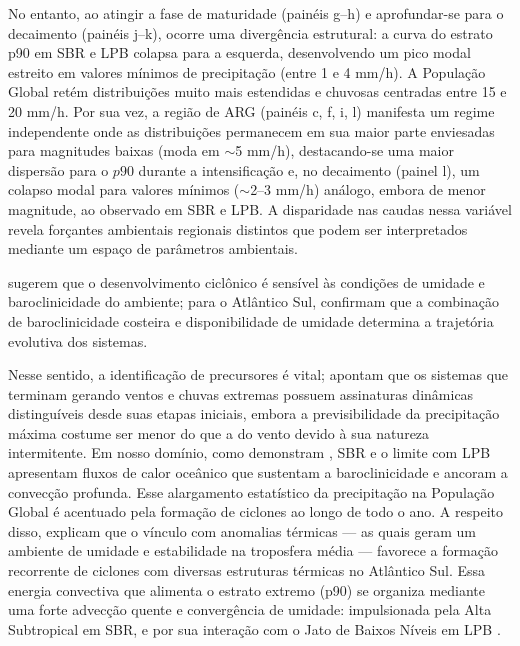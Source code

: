 No entanto, ao atingir a fase de maturidade (painéis g--h) e aprofundar-se para o decaimento (painéis j--k), ocorre uma divergência estrutural: a curva do estrato p90 em SBR e LPB colapsa para a esquerda, desenvolvendo um pico modal estreito em valores mínimos de precipitação (entre 1 e 4 mm/h).
A População Global retém distribuições muito mais estendidas e chuvosas centradas entre 15 e 20 mm/h.
Por sua vez, a região de ARG (painéis c, f, i, l) manifesta um regime independente onde as distribuições permanecem em sua maior parte enviesadas para magnitudes baixas (moda em $\sim$5 mm/h), destacando-se uma maior dispersão para o $p90$ durante a intensificação e, no decaimento (painel l), um colapso modal para valores mínimos ($\sim$2--3 mm/h) análogo, embora de menor magnitude, ao observado em SBR e LPB.
A disparidade nas caudas nessa variável revela forçantes ambientais regionais distintos que podem ser interpretados mediante um espaço de parâmetros ambientais.

\citet{yanase2014parameter} sugerem que o desenvolvimento ciclônico é sensível às condições de umidade e baroclinicidade do ambiente; para o Atlântico Sul, \citet{gramcianinov2019properties} confirmam que a combinação de baroclinicidade costeira e disponibilidade de umidade determina a trajetória evolutiva dos sistemas.

Nesse sentido, a identificação de precursores é vital; \citet{laurila2021characteristics} apontam que os sistemas que terminam gerando ventos e chuvas extremas possuem assinaturas dinâmicas distinguíveis desde suas etapas iniciais, embora a previsibilidade da precipitação máxima costume ser menor do que a do vento devido à sua natureza intermitente.
Em nosso domínio, como demonstram \citet{russo2025impacts}, SBR e o limite com LPB apresentam fluxos de calor oceânico que sustentam a baroclinicidade e ancoram a convecção profunda.
Esse alargamento estatístico da precipitação na População Global é acentuado pela formação de ciclones ao longo de todo o ano. A respeito disso, \citet{evans2012climatology} explicam que o vínculo com anomalias térmicas --- as quais geram um ambiente de umidade e estabilidade na troposfera média --- favorece a formação recorrente de ciclones com diversas estruturas térmicas no Atlântico Sul.
Essa energia convectiva que alimenta o estrato extremo (p90) se organiza mediante uma forte advecção quente e convergência de umidade: impulsionada pela Alta Subtropical em SBR, e por sua interação com o Jato de Baixos Níveis em LPB \citep{gramcianinov2024early}.

